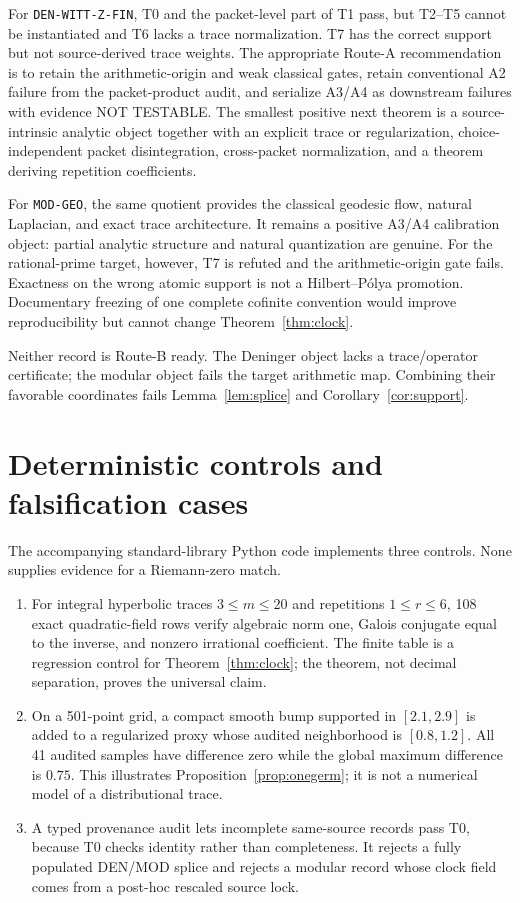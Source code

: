 \documentclass[11pt]{article}
\theoremstyle{definition}
\theoremstyle{remark}
\newcommand{\nottest}{\textsf{NOT TESTABLE}\xspace}
\begin{document}
For \texttt{DEN-WITT-Z-FIN}, T0 and the packet-level part of T1 pass, but
T2--T5 cannot be instantiated and T6 lacks a trace normalization.  T7 has the
correct support but not source-derived trace weights.  The appropriate Route-A
recommendation is to retain the arithmetic-origin and weak classical gates,
retain conventional A2 failure from the packet-product audit, and serialize
A3/A4 as downstream failures with evidence \nottest.  The smallest positive
next theorem is a source-intrinsic analytic object together with an explicit
trace or regularization, choice-independent packet disintegration,
cross-packet normalization, and a theorem deriving repetition coefficients.

For \texttt{MOD-GEO}, the same quotient provides the classical geodesic flow,
natural Laplacian, and exact trace architecture.  It remains a positive
A3/A4 calibration object: partial analytic structure and natural
quantization are genuine.  For the rational-prime target, however, T7 is
refuted and the arithmetic-origin gate fails.  Exactness on the wrong atomic
support is not a Hilbert--P\'olya promotion.  Documentary freezing of one
complete cofinite convention would improve reproducibility but cannot change
Theorem~\ref{thm:clock}.

Neither record is Route-B ready.  The Deninger object lacks a trace/operator
certificate; the modular object fails the target arithmetic map.  Combining
their favorable coordinates fails Lemma~\ref{lem:splice} and
Corollary~\ref{cor:support}.

\section{Deterministic controls and falsification cases}
\label{sec:controls}

The accompanying standard-library Python code implements three controls.
None supplies evidence for a Riemann-zero match.

\begin{enumerate}[leftmargin=*,itemsep=3pt]
 \item For integral hyperbolic traces \(3\le m\le20\) and repetitions
 \(1\le r\le6\), 108 exact quadratic-field rows verify algebraic norm one,
 Galois conjugate equal to the inverse, and nonzero irrational coefficient.
 The finite table is a regression control for Theorem~\ref{thm:clock}; the
 theorem, not decimal separation, proves the universal claim.
 \item On a 501-point grid, a compact smooth bump supported in
 \([2.1,2.9]\) is added to a regularized proxy whose audited neighborhood is
 \([0.8,1.2]\).  All 41 audited samples have difference zero while the global
 maximum difference is \(0.75\).  This illustrates
 Proposition~\ref{prop:onegerm}; it is not a numerical model of a
 distributional trace.
 \item A typed provenance audit lets incomplete same-source records pass T0,
 because T0 checks identity rather than completeness.  It rejects a fully
 populated DEN/MOD splice and rejects a modular record whose clock field comes
 from a post-hoc rescaled source lock.
\end{enumerate}
\end{document}
